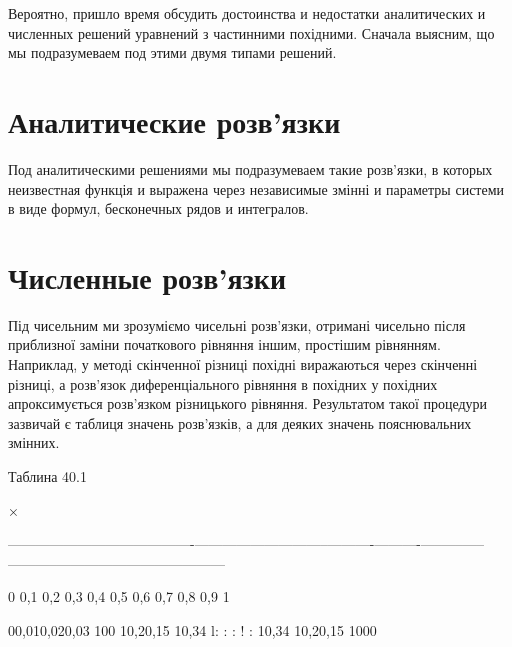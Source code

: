 \documentclass[
  ukrainian,
]{article}
\begin{document}
Вероятно, пришло время обсудить достоинства и недостатки аналитических и
численных решений уравнений з частинними похідними. Сначала выясним, що
мы подразумеваем под этими двумя типами решений.

\section{Аналитические
розв'язки}\label{ux430ux43dux430ux43bux438ux442ux438ux447ux435ux441ux43aux438ux435-ux440ux43eux437ux432ux44fux437ux43aux438}

Под аналитическими решениями мы подразумеваем такие розв'язки, в которых
неизвестная функція и выражена через независимые змінні и параметры
системи в виде формул, бесконечных рядов и интегралов.

\section{Численные
розв'язки}\label{ux447ux438ux441ux43bux435ux43dux43dux44bux435-ux440ux43eux437ux432ux44fux437ux43aux438}

Під чисельним ми зрозуміємо чисельні розв'язки, отримані чисельно після
приблизної заміни початкового рівняння іншим, простішим рівнянням.
Наприклад, у методі скінченної різниці похідні виражаються через
скінченні різниці, а розв'язок диференціального рівняння в похідних у
похідних апроксимується розв'язком різницького рівняння. Результатом
такої процедури зазвичай є таблиця значень розв'язків, а для деяких
значень пояснювальних змінних.

Таблина 40.1

\textbar{} × \textbar{} \textbar{} \textbar{} \textbar{} \textbar{}
\textbar{} \textbar{} \textbar{} \textbar{} \textbar{} \textbar{}

\textbar---------------------------\textbar-------------\textbar------------------\textbar-----------\textbar----------\textbar----------\textbar-----\textbar-----\textbar-----\textbar-----------\textbar------------------\textbar------------------\textbar{}

\textbar{} 0 \textbar{} 0,1 \textbar{} 0,2 \textbar{} 0,3 \textbar{} 0,4
\textbar{} 0,5 \textbar{} 0,6 \textbar{} 0,7 \textbar{} 0,8 \textbar{}
0,9 \textbar{} 1 \textbar{}

00,010,020,03 \textbar{} 100 \textbar{} 10,20,15 \textbar{} 10,34
\textbar{} l: \textbar{} : \textbar{} : \textbar{} ! \textbar{} :
\textbar{} 10,34 \textbar{} 10,20,15 \textbar{} 1000 \textbar{}
\end{document}
